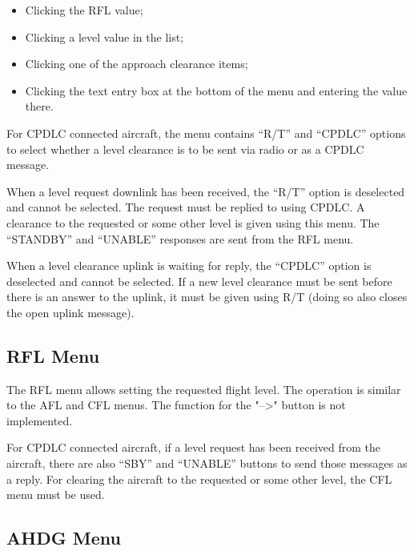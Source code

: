 \documentclass[a4paper,oneside,11pt]{memoir}
\begin{document}
\begin{itemize}
        \item Clicking the RFL value;
        \item Clicking a level value in the list;
        \item Clicking one of the approach clearance items;
        \item Clicking the text entry box at the bottom of the menu and entering the value there.
\end{itemize}


For CPDLC connected aircraft, the menu contains “R/T” and “CPDLC” options to select whether a level clearance is to be sent via radio or as a CPDLC message.

\bigskip

When a level request downlink has been received, the “R/T” option is deselected and cannot be selected. The request must be replied to using CPDLC. A clearance to the requested or some other level is given using this menu. The “STANDBY” and “UNABLE” responses are sent from the RFL menu.

\bigskip

When a level clearance uplink is waiting for reply, the “CPDLC” option is deselected and cannot be selected. If a new level clearance must be sent before there is an answer to the uplink, it must be given using R/T (doing so also closes the open uplink message).

\subsection{RFL Menu}
\label{menu:rfl}


The RFL menu allows setting the requested flight level. The operation is similar to the AFL and CFL menus. The function for the "-->" button is not implemented.

\bigskip


For CPDLC connected aircraft, if a level request has been received from the aircraft, there are also “SBY” and “UNABLE” buttons to send those messages as a reply. For clearing the aircraft to the requested or some other level, the CFL menu must be used.

\subsection{AHDG Menu}
\label{menu:ahdg}
\end{document}
